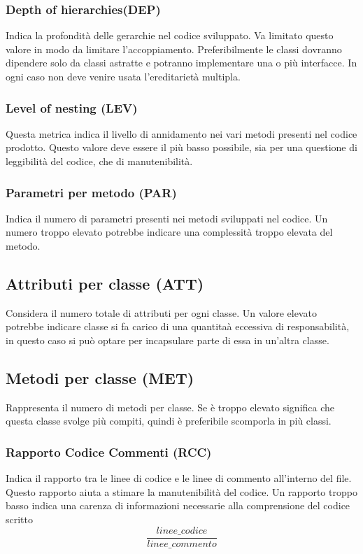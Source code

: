 \subsubsection{Depth of hierarchies(DEP)}
Indica la profondità delle gerarchie nel codice sviluppato. Va limitato questo valore in modo da limitare l'accoppiamento. Preferibilmente le classi dovranno dipendere solo da classi astratte e potranno implementare una o più interfacce. In ogni caso non deve venire usata l'ereditarietà multipla.

\subsubsection{Level of nesting (LEV)}
Questa metrica indica il livello di annidamento nei vari metodi presenti nel codice prodotto. Questo valore deve essere il più basso possibile, sia per una questione di leggibilità del codice, che di manutenibilità.


\subsubsection{Parametri per metodo (PAR)}
Indica il numero di parametri presenti nei metodi sviluppati nel codice. Un numero troppo elevato potrebbe indicare una complessità troppo elevata del metodo.

\subsection{Attributi per classe (ATT)}
Considera il numero totale di attributi per ogni classe. Un valore elevato potrebbe indicare classe si fa carico di una quantitaà eccessiva di responsabilità, in questo caso si può optare per incapsulare parte di essa in un'altra classe.

\subsection{Metodi per classe (MET)}
Rappresenta il numero di metodi per classe. Se è troppo elevato significa che questa classe svolge più compiti, quindi è preferibile scomporla in più classi.

\subsubsection{Rapporto Codice Commenti (RCC)}
Indica il rapporto tra le linee di codice e le linee di commento all'interno del file. Questo rapporto aiuta a stimare la manutenibilità del codice. Un rapporto troppo basso indica una carenza di informazioni necessarie alla comprensione del codice scritto
\[\frac{linee\_codice}{linee\_commento}\]

